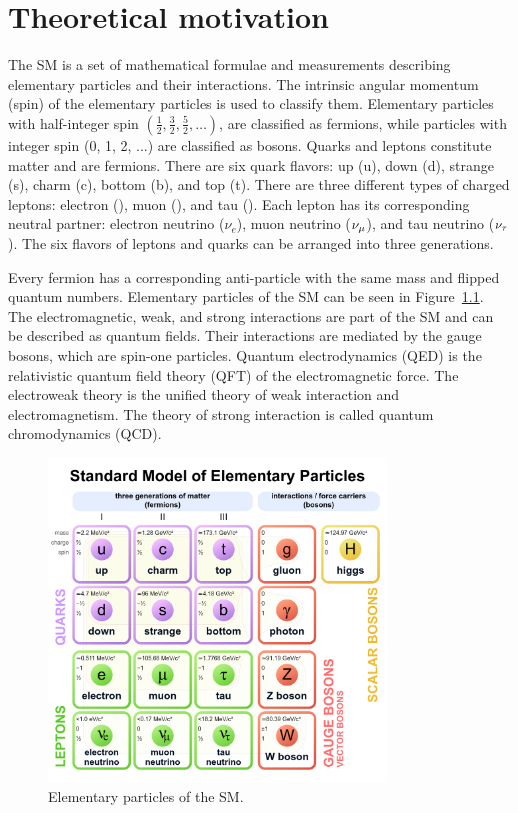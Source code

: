 %
%

\chapter{Theoretical motivation}
\label{theory}

The SM is a set of mathematical formulae and measurements describing elementary particles and their interactions. The intrinsic angular momentum (spin) of the elementary particles is used to classify them. Elementary particles with half-integer spin $(\frac{1}{2}, \frac{3}{2}, \frac{5}{2}, \ldots)$, are classified as fermions, while particles with integer spin (0, 1, 2, ...) are classified as bosons. Quarks and leptons constitute matter and are fermions. There are six quark flavors: up (u), down (d), strange (s), charm (c), bottom (b), and top (t). There are three different types of charged leptons: electron (\Pe), muon (\Pgm), and tau (\Pgt). Each lepton has its corresponding neutral partner: electron neutrino ($\nu_{e}$), muon neutrino ($\nu_{\mu}$), and tau neutrino ($\nu_{\tau}$). The six flavors of leptons and quarks can be arranged into three generations.

Every fermion has a corresponding anti-particle with the same mass and flipped quantum numbers. Elementary particles of the SM can be seen in Figure~\ref{fig:sm_particles}. The electromagnetic, weak, and strong interactions are part of the SM and can be described as quantum fields. Their interactions are mediated by the gauge bosons, which are spin-one particles. Quantum electrodynamics (QED) is the relativistic quantum field theory (QFT) of the electromagnetic force. The electroweak theory is the unified theory of weak interaction and electromagnetism. The theory of strong interaction is called quantum chromodynamics (QCD).

\begin{figure}[htbp]
  \centering
  \includegraphics[width=0.8\textwidth]{plots/chapter2/sm_particles.png}
  \caption{Elementary particles of the SM.}
  \label{fig:sm_particles}
\end{figure}


